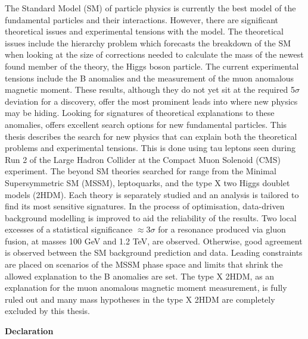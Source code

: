 \begin{titlepage}
\begin{adjustwidth}{1cm}{1cm}
The Standard Model (SM) of particle physics is currently the best model of the fundamental particles and their interactions. 
However, there are significant theoretical issues and experimental tensions with the model. 
The theoretical issues include the hierarchy problem which forecasts the breakdown of the SM when looking at the size of corrections needed to calculate the mass of the newest found member of the theory, the Higgs boson particle. 
The current experimental tensions include the B anomalies and the measurement of the muon anomalous magnetic moment. 
These results, although they do not yet sit at the required 5$\sigma$ deviation for a discovery, offer the most prominent leads into where new physics may be hiding. 
Looking for signatures of theoretical explanations to these anomalies, offers excellent search options for new fundamental particles. 
This thesis describes the search for new physics that can explain both the theoretical problems and experimental tensions. 
This is done using tau leptons seen during Run 2 of the Large Hadron Collider at the Compact Muon Solenoid (CMS) experiment. 
The beyond SM theories searched for range from the Minimal Supersymmetric SM (MSSM), leptoquarks, and the type X two Higgs doublet models (2HDM). 
Each theory is separately studied and an analysis is tailored to find its most sensitive signatures. 
In the process of optimisation, data-driven background modelling is improved to aid the reliability of the results. 
Two local excesses of a statistical significance $\approx 3\sigma$ for a resonance produced via gluon fusion, at masses 100 GeV and 1.2 TeV, are observed. 
Otherwise, good agreement is observed between the SM background prediction and data.
Leading constraints are placed on scenarios of the MSSM phase space and limits that shrink the allowed explanation to the B anomalies are set.
The type X 2HDM, as an explanation for the muon anomalous magnetic moment measurement, is fully ruled out and many mass hypotheses in the type X 2HDM are completely excluded by this thesis.
\end{adjustwidth}
\vspace*{\fill}
\newpage

\vspace*{\fill}
\begin{adjustwidth}{1cm}{1cm}
\begin{center}
\Large \textbf{Declaration}
\vspace{0.5cm}
\end{center}


\end{adjustwidth}
\end{titlepage}
